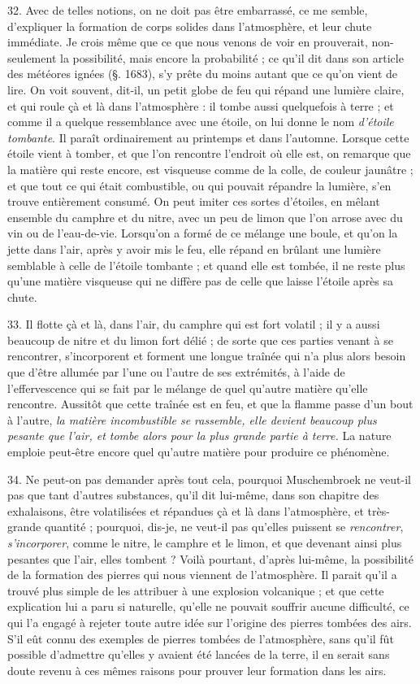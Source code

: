 \documentclass[a4paper, 11pt, oneside, polutonikogreek, french]{article}
\begin{document}
32. Avec de telles notions, on ne doit pas être embarrassé, ce me semble, d'expliquer la formation de corps solides dans l'atmosphère, et leur chute immédiate. Je crois même que ce que nous venons de voir en prouverait, non-seulement la possibilité, mais encore la probabilité ; ce qu'il dit dans son article des météores ignées (§. 1683), s'y prête du moins autant que ce qu'on vient de lire. \og On voit souvent, dit-il, un petit globe de feu qui répand une lumière claire, et qui roule çà et là dans l'atmosphère : il tombe aussi quelquefois à terre ; et comme il a quelque ressemblance avec une étoile, on lui donne le nom \emph{d'étoile tombante}. Il paraît ordinairement au printemps et dans l'automne. Lorsque cette étoile vient à tomber, et que l'on rencontre l'endroit où elle est, on remarque que la matière qui reste encore, est visqueuse comme de la colle, de couleur jaunâtre ; et que tout ce qui était combustible, ou qui pouvait répandre la lumière, s'en trouve entièrement consumé. On peut imiter ces sortes d'étoiles, en mêlant ensemble du camphre et du nitre, avec un peu de limon que l'on arrose avec du vin ou de l'eau-de-vie. Lorsqu'on a formé de ce mélange une boule, et qu'on la jette dans l'air, après y avoir mis le feu, elle répand en brûlant une lumière semblable à celle de l'étoile tombante ; et quand elle est tombée, il ne reste plus qu'une matière visqueuse qui ne diffère pas de celle que laisse l'étoile après sa chute. \fg

33. \og Il flotte çà et là, dans l'air, du camphre qui est fort volatil ; il y a aussi beaucoup de nitre et du limon fort délié ; de sorte que ces parties venant à se rencontrer, s'incorporent et forment une longue traînée qui n'a plus alors besoin que d'être allumée par l'une ou l'autre de ses extrémités, à l'aide de l'effervescence qui se fait par le mélange de quel qu’autre matière qu'elle rencontre. Aussitôt que cette traînée est en feu, et que la flamme passe d'un bout à l'autre, \emph{la matière incombustible se rassemble, elle devient beaucoup plus pesante que l'air, et tombe alors pour la plus grande partie à terre.} La nature emploie peut-être encore quel qu’autre matière pour produire ce phénomène. \fg

34. Ne peut-on pas demander après tout cela, pourquoi Muschembroek ne veut-il pas que tant d'autres substances, qu’il dit lui-même, dans son chapitre des exhalaisons, être volatilisées et répandues çà et là dans l'atmosphère, et très-grande quantité ; pourquoi, dis-je, ne veut-il pas qu'elles puissent se \emph{rencontrer}, \emph{s'incorporer}, comme le nitre, le camphre et le limon, et que devenant ainsi plus pesantes que l'air, elles tombent ? Voilà pourtant, d'après lui-même, la possibilité de la formation des pierres qui nous viennent de l'atmosphère. Il parait qu'il a trouvé plus simple de les attribuer à une explosion volcanique ; et que cette explication lui a paru si naturelle, qu'elle ne pouvait souffrir aucune difficulté, ce qui l'a engagé à rejeter toute autre idée sur l'origine des pierres tombées des airs. S'il eût connu des exemples de pierres tombées de l'atmosphère, sans qu'il fût possible d'admettre qu'elles y avaient été lancées de la terre, il en serait sans doute revenu à ces mêmes raisons pour prouver leur formation dans les airs.
\end{document}
